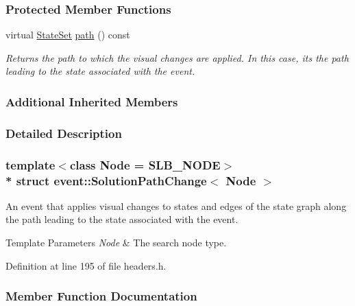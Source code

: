 \subsubsection*{Protected Member Functions}
\begin{DoxyCompactItemize}
\item 
virtual \hyperlink{structevent_1_1UniformChange_a71997f4cc920d6c5c65fab2049d5e42d}{State\+Set} \hyperlink{structevent_1_1SolutionPathChange_a04f9ebe9ddc1c12f18dee935ddb8bc03}{path} () const 
\begin{DoxyCompactList}\small\item\em Returns the path to which the visual changes are applied. In this case, it\textquotesingle{}s the path leading to the state associated with the event. \end{DoxyCompactList}\end{DoxyCompactItemize}
\subsubsection*{Additional Inherited Members}


\subsubsection{Detailed Description}
\subsubsection*{template$<$class Node = S\+L\+B\+\_\+\+N\+O\+DE$>$\\*
struct event\+::\+Solution\+Path\+Change$<$ Node $>$}

An event that applies visual changes to states and edges of the state graph along the path leading to the state associated with the event. 


\begin{DoxyTemplParams}{Template Parameters}
{\em Node} & The search node type. \\
\hline
\end{DoxyTemplParams}


Definition at line 195 of file headers.\+h.



\subsubsection{Member Function Documentation}
